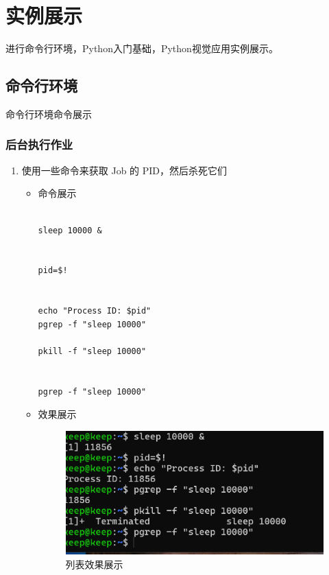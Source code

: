 \documentclass[UTF8]{ctexart}
\begin{document}
\section{实例展示}
{\color{red}进行命令行环境，Python入门基础，Python视觉应用实例展示。}
  \subsection{命令行环境}
  {\color{blue}命令行环境命令展示}



\subsubsection{后台执行作业}

\begin{enumerate}
  \item 使用一些命令来获取 Job 的 PID，然后杀死它们
  \begin{itemize}
  \item 命令展示
  \begin{verbatim}

sleep 10000 &


pid=$!


echo "Process ID: $pid"
pgrep -f "sleep 10000"

pkill -f "sleep 10000"


pgrep -f "sleep 10000"  

  \end{verbatim}
\item 效果展示
 \begin{figure}[H]
    \centering
    \includegraphics[width=\textwidth]{1} %
    \caption{列表效果展示}
  \end{figure}
  \end{itemize}
\end{enumerate}
\end{document}
